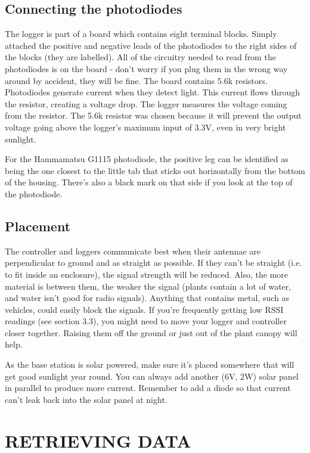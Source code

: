 \documentclass[10pt]{article}
\begin{document}
\subsection{Connecting the photodiodes}

The logger is part of a board which contains eight terminal blocks. Simply attached the positive and negative leads of the photodiodes to the right sides of the blocks (they are labelled). All of the circuitry needed to read from the photodiodes is on the board - don't worry if you plug them in the wrong way around by accident, they will be fine. The board contains 5.6k resistors. Photodiodes generate current when they detect light. This current flows through the resistor, creating a voltage drop. The logger measures the voltage coming from the resistor. The 5.6k resistor was chosen because it will prevent the output voltage going above the logger's maximum input of 3.3V, even in very bright sunlight.

For the Hammamatsu G1115 photodiode, the positive leg can be identified as being the one closest to the little tab that sticks out horizontally from the bottom of the housing. There's also a black mark on that side if you look at the top of the photodiode.

\subsection{Placement}

The controller and loggers communicate best when their antennae are perpendicular to ground and as straight as possible. If they can't be straight (i.e. to fit inside an enclosure), the signal strength will be reduced. Also, the more material is between them, the weaker the signal (plants contain a lot of water, and water isn't good for radio signals). Anything that contains metal, such as vehicles, could easily block the signals. If you're frequently getting low RSSI readings (see section 3.3), you might need to move your logger and controller closer together. Raising them off the ground or just out of the plant canopy will help.

As the base station is solar powered, make sure it's placed somewhere that will get good sunlight year round. You can always add another (6V, 2W) solar panel in parallel to produce more current. Remember to add a diode so that current can't leak back into the solar panel at night.

\section{RETRIEVING DATA}
\end{document}
